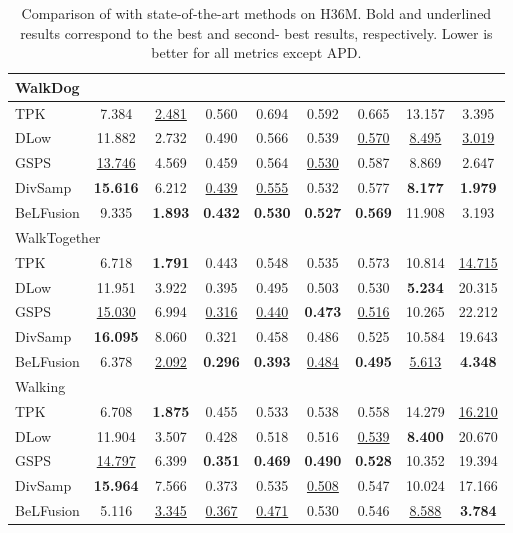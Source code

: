 \documentclass[10pt,twocolumn,letterpaper]{article}
\begin{document}
\begin{table*}[t!]
\begin{minipage}{0.495\textwidth}
\begin{tabular}{lcccccccc@{\hskip 2mm}}
WalkDog \\
\midrule
TPK & 7.384 & \underline{2.481} & 0.560 & 0.694 & 0.592 & 0.665 & 13.157 & 3.395 \\
DLow & 11.882 & 2.732 & 0.490 & 0.566 & 0.539 & \underline{0.570} & \underline{8.495} & \underline{3.019} \\
GSPS & \underline{13.746} & 4.569 & 0.459 & 0.564 & \underline{0.530} & 0.587 & 8.869 & 2.647 \\
DivSamp & \textbf{15.616} & 6.212 & \underline{0.439} & \underline{0.555} & 0.532 & 0.577 & \textbf{8.177} & \textbf{1.979} \\
BeLFusion & 9.335 & \textbf{1.893} & \textbf{0.432} & \textbf{0.530} & \textbf{0.527} & \textbf{0.569} & 11.908 & 3.193 \\
\midrule

\multicolumn{2}{l}{WalkTogether} \\
\midrule
TPK & 6.718 & \textbf{1.791} & 0.443 & 0.548 & 0.535 & 0.573 & 10.814 & \underline{14.715} \\
DLow & 11.951 & 3.922 & 0.395 & 0.495 & 0.503 & 0.530 & \textbf{5.234} & 20.315 \\
GSPS & \underline{15.030} & 6.994 & \underline{0.316} & \underline{0.440} & \textbf{0.473} & \underline{0.516} & 10.265 & 22.212 \\
DivSamp & \textbf{16.095} & 8.060 & 0.321 & 0.458 & 0.486 & 0.525 & 10.584 & 19.643 \\
BeLFusion & 6.378 & \underline{2.092} & \textbf{0.296} & \textbf{0.393} & \underline{0.484} & \textbf{0.495} & \underline{5.613} & \textbf{4.348} \\
\midrule

Walking \\
\midrule
TPK & 6.708 & \textbf{1.875} & 0.455 & 0.533 & 0.538 & 0.558 & 14.279 & \underline{16.210} \\
DLow & 11.904 & 3.507 & 0.428 & 0.518 & 0.516 & \underline{0.539} & \textbf{8.400} & 20.670 \\
GSPS & \underline{14.797} & 6.399 & \textbf{0.351} & \textbf{0.469} & \textbf{0.490} & \textbf{0.528} & 10.352 & 19.394 \\
DivSamp & \textbf{15.964} & 7.566 & 0.373 & 0.535 & \underline{0.508} & 0.547 & 10.024 & 17.166 \\
BeLFusion & 5.116 & \underline{3.345} & \underline{0.367} & \underline{0.471} & 0.530 & 0.546 & \underline{8.588} & \textbf{3.784} \\



 \bottomrule
    \end{tabular}
\end{minipage}
\caption{Comparison of \modelname{} with state-of-the-art methods on H36M. Bold and underlined results correspond to the best and second-
best results, respectively. Lower is better for all metrics except APD.}
    \label{tab:supp_sota_comparison_h36m}
\end{table*}
\setlength{\tabcolsep}{6pt}
\end{document}
